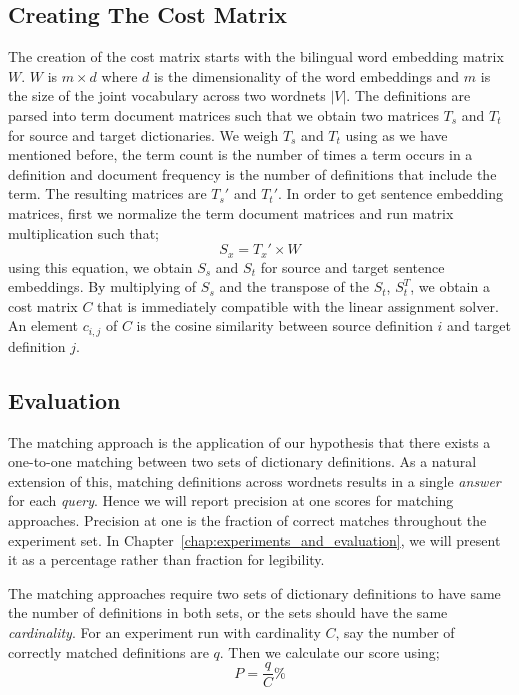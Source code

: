 \subsection{Creating The Cost Matrix}%
\label{sub:creating_the_cost_matrix}

The creation of the cost matrix starts with the bilingual word embedding matrix $W$.
$W$ is $m \times d$ where $d$ is the dimensionality of the word embeddings and $m$ is the size of the joint vocabulary across two wordnets $|V|$.
The definitions are parsed into term document matrices such that we obtain two matrices $T_{s}$ and $T_{t}$ for source and target dictionaries.
We weigh $T_s$ and $T_t$ using \tfidf{} as we have mentioned before, the term count is the number of times a term occurs in a definition and document frequency is the number of definitions that include the term.
The resulting matrices are $T_s'$ and $T_t'$.
In order to get sentence embedding matrices, first we normalize the term document matrices and run matrix multiplication such that;
\begin{equation}
    S_{x} = T_x' \times W
\end{equation}
using this equation, we obtain $S_s$ and $S_t$ for source and target sentence embeddings.
By multiplying of $S_s$ and the transpose of the $S_t$, $S_t^T$, we obtain a cost matrix $C$ that is immediately compatible with the linear assignment solver.
An element $c_{i,j}$ of $C$ is the cosine similarity between source definition $i$ and target definition $j$.

\subsection{Evaluation}%
\label{sub:evaluation}

The matching approach is the application of our hypothesis that there exists a one-to-one matching between two sets of dictionary definitions.
As a natural extension of this, matching definitions across wordnets results in a single \emph{answer} for each \emph{query}.
Hence we will report precision at one scores for matching approaches.
Precision at one is the fraction of correct matches throughout the experiment set.
In Chapter~\ref{chap:experiments_and_evaluation}, we will present it as a percentage rather than fraction for legibility.

The matching approaches require two sets of dictionary definitions to have same the number of definitions in both sets, or the sets should have the same \emph{cardinality}.
For an experiment run with cardinality $C$, say the number of correctly matched definitions are $q$.
Then we calculate our score using;
\begin{equation}
    P = \frac{q}{C}\%
\end{equation}
